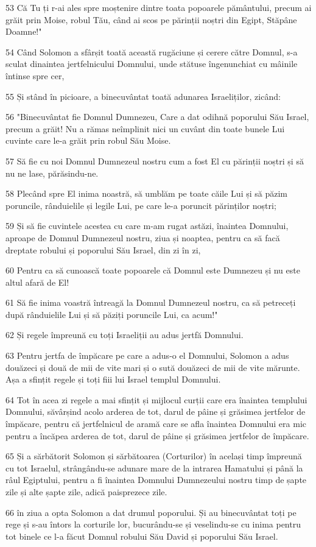 \par 53 Că Tu ți r-ai ales spre moștenire dintre toata popoarele pământului, precum ai grăit prin Moise, robul Tău, când ai scos pe părinții noștri din Egipt, Stăpâne Doamne!"
\par 54 Când Solomon a sfârșit toată această rugăciune și cerere către Domnul, s-a sculat dinaintea jertfelnicului Domnului, unde stătuse îngenunchiat cu mâinile întinse spre cer,
\par 55 Și stând în picioare, a binecuvântat toată adunarea Israeliților, zicând:
\par 56 "Binecuvântat fie Domnul Dumnezeu, Care a dat odihnă poporului Său Israel, precum a grăit! Nu a rămas neîmplinit nici un cuvânt din toate bunele Lui cuvinte care le-a grăit prin robul Său Moise.
\par 57 Să fie cu noi Domnul Dumnezeul nostru cum a fost El cu părinții noștri și să nu ne lase, părăsindu-ne.
\par 58 Plecând spre El inima noastră, să umblăm pe toate căile Lui și să păzim poruncile, rânduielile și legile Lui, pe care le-a poruncit părinților noștri;
\par 59 Și să fie cuvintele acestea cu care m-am rugat astăzi, înaintea Domnului, aproape de Domnul Dumnezeul nostru, ziua și noaptea, pentru ca să facă dreptate robului și poporului Său Israel, din zi în zi,
\par 60 Pentru ca să cunoască toate popoarele că Domnul este Dumnezeu și nu este altul afară de El!
\par 61 Să fie inima voastră întreagă la Domnul Dumnezeul nostru, ca să petreceți după rânduielile Lui și să păziți poruncile Lui, ca acum!"
\par 62 Și regele împreună cu toți Israeliții au adus jertfă Domnului.
\par 63 Pentru jertfa de împăcare pe care a adus-o el Domnului, Solomon a adus douăzeci și două de mii de vite mari și o sută douăzeci de mii de vite mărunte. Așa a sfințit regele și toți fiii lui Israel templul Domnului.
\par 64 Tot în acea zi regele a mai sfințit și mijlocul curții care era înaintea templului Domnului, săvârșind acolo arderea de tot, darul de pâine și grăsimea jertfelor de împăcare, pentru că jertfelnicul de aramă care se afla înaintea Domnului era mic pentru a încăpea arderea de tot, darul de pâine și grăsimea jertfelor de împăcare.
\par 65 Și a sărbătorit Solomon și sărbătoarea (Corturilor) în același timp împreună cu tot Israelul, strângându-se adunare mare de la intrarea Hamatului și până la râul Egiptului, pentru a fi înaintea Domnului Dumnezeului nostru timp de șapte zile și alte șapte zile, adică paisprezece zile.
\par 66 în ziua a opta Solomon a dat drumul poporului. Și au binecuvântat toți pe rege și s-au întors la corturile lor, bucurându-se și veselindu-se cu inima pentru tot binele ce l-a făcut Domnul robului Său David și poporului Său Israel.

